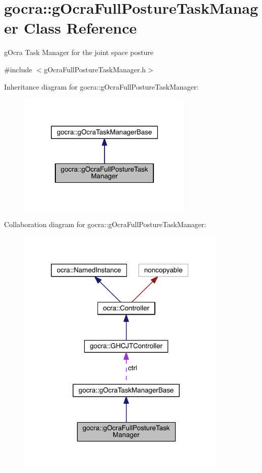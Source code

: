 \hypertarget{classgocra_1_1gOcraFullPostureTaskManager}{}\section{gocra\+:\+:g\+Ocra\+Full\+Posture\+Task\+Manager Class Reference}
\label{classgocra_1_1gOcraFullPostureTaskManager}


g\+Ocra Task Manager for the joint space posture  




{\ttfamily \#include $<$g\+Ocra\+Full\+Posture\+Task\+Manager.\+h$>$}



Inheritance diagram for gocra\+:\+:g\+Ocra\+Full\+Posture\+Task\+Manager\+:\nopagebreak
\begin{figure}[H]
\begin{center}
\leavevmode
\includegraphics[width=237pt]{dc/d1b/classgocra_1_1gOcraFullPostureTaskManager__inherit__graph}
\end{center}
\end{figure}


Collaboration diagram for gocra\+:\+:g\+Ocra\+Full\+Posture\+Task\+Manager\+:\nopagebreak
\begin{figure}[H]
\begin{center}
\leavevmode
\includegraphics[width=282pt]{dc/dfa/classgocra_1_1gOcraFullPostureTaskManager__coll__graph}
\end{center}
\end{figure}
